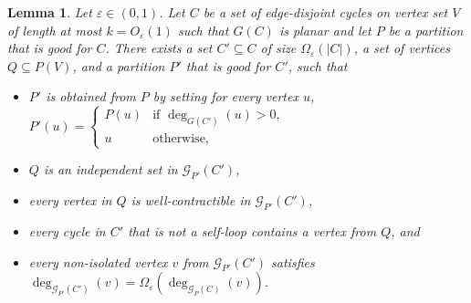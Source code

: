 \documentclass[11pt]{article}
\newtheorem{lemma}[theorem]{Lemma}
\newcommand{\eps}{\ensuremath{\epsilon}}
\def\epsilon{\ensuremath{\varepsilon}}
\begin{document}
\begin{lemma}
\label{lemma:MainStep}
Let $\eps \in (0,1)$. Let $C$ be a set of edge-disjoint cycles on vertex set $V$ of length at most $k=O_{\eps}(1)$ such that $G(C)$ is planar and let $P$ be a partition that is good for $C$. There exists a set $C' \subseteq C$ of size $\Omega_{\epsilon}(|C|)$, a set of vertices $Q \subseteq P(V)$,
and a partition $P'$ that is good for $C'$, such that
\begin{itemize}
\item $P'$ is obtained from $P$ by setting for every vertex $u$,
    $P'(u) = \begin{cases}
        P(u) & \mbox{if $\deg_{G(C')}(u) > 0$,} \\
        u & \mbox{otherwise,}
    \end{cases}$
\item $Q$ is an independent set in $\mathcal G_{P'}(C')$,
\item every vertex in $Q$ is well-contractible in $\mathcal G_{P'}(C')$,
\item every cycle in $C'$ that is not a self-loop contains a vertex from $Q$, and
\item every non-isolated vertex $v$ from $\mathcal G_{P'}(C')$ satisfies $\deg_{\mathcal G_{P'}(C')}(v) = \Omega_{\eps}(\deg_{\mathcal G_{P}(C)}(v))$.
\end{itemize}
\end{lemma}
\end{document}
